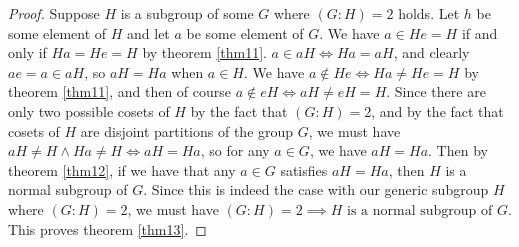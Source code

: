 \documentclass[12pt]{article}
\begin{document}
\begin{proof}
	Suppose $H$ is a subgroup of some $G$
	where $(G:H) = 2$ holds.
	Let $h$ be some element of $H$
	and let $a$ be some element of $G$.
	We have $a \in He = H$
	if and only if
	$Ha = He = H$
	by theorem \ref{thm11}.
	$a \in aH \iff Ha = aH$,
	and clearly $ae = a \in aH$,
	so $aH = Ha$ when $a \in H$.
	We have $a \not\in He \iff Ha \neq He = H$
	by theorem \ref{thm11},
	and then of course $a \not\in eH \iff aH \neq eH = H$.
	Since there are only two possible cosets of $H$
	by the fact that $(G:H) = 2$,
	and by the fact that cosets of $H$
	are disjoint partitions of the group $G$,
	we must have $aH \neq H \land Ha \neq H \iff aH = Ha$,
	so for any $a \in G$, we have $aH = Ha$.
	Then by theorem \ref{thm12},
	if we have that any $a \in G$
	satisfies $aH = Ha$,
	then $H$ is a normal subgroup of $G$.
	Since this is indeed the case with our generic
	subgroup  $H$ where $(G:H) = 2$,
	we must have $(G:H) = 2 \implies H \textrm{ is a normal subgroup of } G$.
	This proves theorem \ref{thm13}.
\end{proof}
\end{document}
